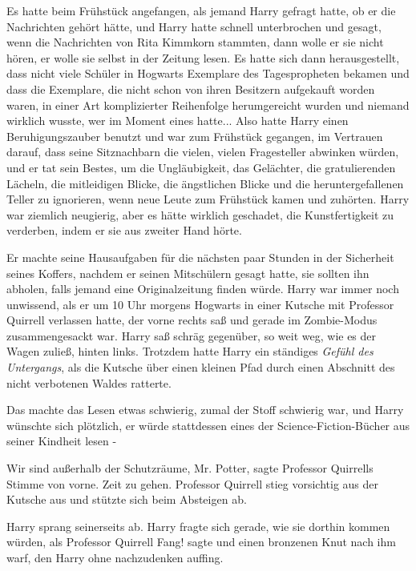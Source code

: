 Es hatte beim Frühstück angefangen, als jemand Harry gefragt hatte, ob er die
Nachrichten gehört hätte, und Harry hatte schnell unterbrochen und gesagt, wenn
die Nachrichten von Rita Kimmkorn stammten, dann wolle er sie nicht hören, er
wolle sie selbst in der Zeitung lesen. Es hatte sich dann herausgestellt, dass
nicht viele Schüler in Hogwarts Exemplare des Tagespropheten bekamen und dass
die Exemplare, die nicht schon von ihren Besitzern aufgekauft worden waren, in
einer Art komplizierter Reihenfolge herumgereicht wurden und niemand wirklich
wusste, wer im Moment eines hatte... Also hatte Harry einen Beruhigungszauber
benutzt und war zum Frühstück gegangen, im Vertrauen darauf, dass seine
Sitznachbarn die vielen, vielen Fragesteller abwinken würden, und er tat sein
Bestes, um die Ungläubigkeit, das Gelächter, die gratulierenden Lächeln, die
mitleidigen Blicke, die ängstlichen Blicke und die heruntergefallenen Teller zu
ignorieren, wenn neue Leute zum Frühstück kamen und zuhörten. Harry war ziemlich
neugierig, aber es hätte wirklich geschadet, die Kunstfertigkeit zu verderben,
indem er sie aus zweiter Hand hörte.

Er machte seine Hausaufgaben für die nächsten paar Stunden in der Sicherheit
seines Koffers, nachdem er seinen Mitschülern gesagt hatte, sie sollten ihn
abholen, falls jemand eine Originalzeitung finden würde. Harry war immer noch
unwissend, als er um 10 Uhr morgens Hogwarts in einer Kutsche mit Professor
Quirrell verlassen hatte, der vorne rechts saß und gerade im Zombie-Modus
zusammengesackt war. Harry saß schräg gegenüber, so weit weg, wie es der Wagen
zuließ, hinten links. Trotzdem hatte Harry ein ständiges \emph{Gefühl des
Untergangs}, als die Kutsche über einen kleinen Pfad durch einen Abschnitt des
nicht verbotenen Waldes ratterte.

Das machte das Lesen etwas schwierig, zumal der Stoff schwierig war, und Harry
wünschte sich plötzlich, er würde stattdessen eines der Science-Fiction-Bücher
aus seiner Kindheit lesen -

\glqq{}Wir sind außerhalb der Schutzräume, Mr. Potter\grqq{}, sagte Professor
Quirrells Stimme von vorne. \glqq{}Zeit zu gehen.\grqq{} Professor Quirrell stieg
vorsichtig aus der Kutsche aus und stützte sich beim Absteigen ab.

Harry sprang seinerseits ab. Harry fragte sich gerade, wie sie dorthin kommen
würden, als Professor Quirrell \glqq{}Fang!\grqq{} sagte und einen bronzenen Knut
nach ihm warf, den Harry ohne nachzudenken auffing.

